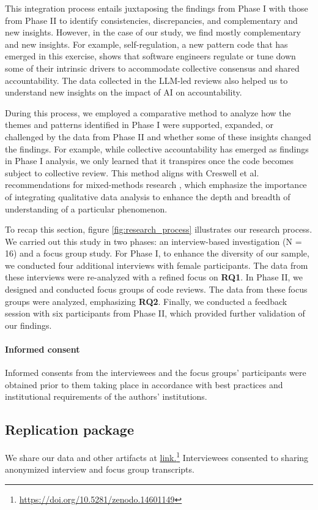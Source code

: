This integration process entails juxtaposing the findings from Phase I with those from Phase II to identify consistencies, discrepancies, and complementary and new insights. However, in the case of our study, we find mostly complementary and new insights. For example, self-regulation, a new pattern code that has emerged in this exercise, shows that software engineers regulate or tune down some of their intrinsic drivers to accommodate collective consensus and shared accountability. The data collected in the LLM-led reviews also helped us to understand new insights on the impact of AI on accountability.

During this process, we employed a comparative method to analyze how the themes and patterns identified in Phase I were supported, expanded, or challenged by the data from Phase II and whether some of these insights changed the findings. For example, while collective accountability has emerged as findings in Phase I analysis, we only learned that it transpires once the code becomes subject to collective review. This method aligns with Creswell et al. recommendations for mixed-methods research \citep{creswell2017designing}, which emphasize the importance of integrating qualitative data analysis to enhance the depth and breadth of understanding of a particular phenomenon.

To recap this section, figure \ref{fig:research_process} illustrates our research process. We carried out this study in two phases: an interview-based investigation (N = 16) and a focus group study. For Phase I, to enhance the diversity of our sample, we conducted four additional interviews with female participants. The data from these interviews were re-analyzed with a refined focus on \textbf{RQ1}. In Phase II, we designed and conducted focus groups of code reviews. The data from these focus groups were analyzed, emphasizing \textbf{RQ2}. Finally, we conducted a feedback session with six participants from Phase II, which provided further validation of our findings.

\paragraph*{Informed consent} Informed consents from the interviewees and the focus groups' participants were obtained prior to them taking place in accordance with best practices and institutional requirements of the authors' institutions. 

\subsection{Replication package} \label{sec:replication} We share our data and other artifacts at \href{https://doi.org/10.5281/zenodo.14601149}{link.}\footnote{\url{https://doi.org/10.5281/zenodo.14601149}} Interviewees consented to sharing anonymized interview and focus group transcripts.
